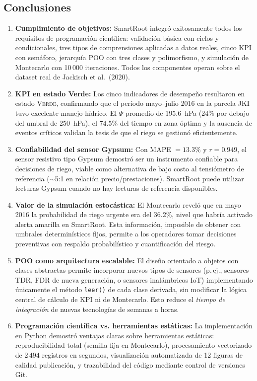 \documentclass[12pt,a4paper]{article}
\begin{document}
\subsection{Conclusiones}

\begin{enumerate}

    \item \textbf{Cumplimiento de objetivos:} SmartRoot integró exitosamente todos los requisitos de programación científica: validación básica con ciclos y condicionales, tres tipos de comprensiones aplicadas a datos reales, cinco KPI con semáforo, jerarquía POO con tres clases y polimorfismo, y simulación de Montecarlo con 10\,000 iteraciones. Todos los componentes operan sobre el dataset real de Jackisch et al.\ (2020).

    \item \textbf{KPI en estado Verde:} Los cinco indicadores de desempeño resultaron en estado \textsc{Verde}, confirmando que el período mayo--julio 2016 en la parcela JKI tuvo excelente manejo hídrico. El $\Psi$ promedio de 195.6~hPa (24\% por debajo del umbral de 250~hPa), el 74.5\% del tiempo en zona óptima y la ausencia de eventos críticos validan la tesis de que el riego se gestionó eficientemente.

    \item \textbf{Confiabilidad del sensor Gypsum:} Con MAPE $= 13.3\%$ y $r = 0.949$, el sensor resistivo tipo Gypsum demostró ser un instrumento confiable para decisiones de riego, viable como alternativa de bajo costo al tensiómetro de referencia ($\sim$5:1 en relación precio/prestaciones). SmartRoot puede utilizar lecturas Gypsum cuando no hay lecturas de referencia disponibles.

    \item \textbf{Valor de la simulación estocástica:} El Montecarlo reveló que en mayo 2016 la probabilidad de riego urgente era del 36.2\%, nivel que habría activado alerta amarilla en SmartRoot. Esta información, imposible de obtener con umbrales determinísticos fijos, permite a los operadores tomar decisiones preventivas con respaldo probabilístico y cuantificación del riesgo.

    \item \textbf{POO como arquitectura escalable:} El diseño orientado a objetos con clases abstractas permite incorporar nuevos tipos de sensores (p.\,ej., sensores TDR, FDR de nueva generación, o sensores inalámbricos IoT) implementando únicamente el método \texttt{leer()} de cada clase derivada, sin modificar la lógica central de cálculo de KPI ni de Montecarlo. Esto reduce el \textit{tiempo de integración} de nuevas tecnologías de semanas a horas.

    \item \textbf{Programación científica vs. herramientas estáticas:} La implementación en Python demostró ventajas claras sobre herramientas estáticas: reproducibilidad total (semilla fija en Montecarlo), procesamiento vectorizado de 2\,494 registros en segundos, visualización automatizada de 12 figuras de calidad publicación, y trazabilidad del código mediante control de versiones Git.

\end{enumerate}
\end{document}
